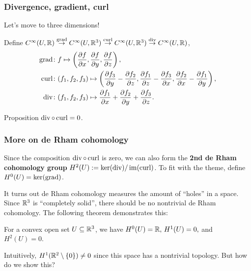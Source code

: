 \documentclass[xcolor=dvipsnames]{beamer}
\begin{document}
    \begin{frame}
        \frametitle{Divergence, gradient, curl} 
        Let's move to three dimensions!
        \begin{definition}
            Define $C^{\infty}(U,\mathbb{R}) \overset{\operatorname{grad}}{\to } C^{\infty}(U,\mathbb{R}^3)\overset{\operatorname{curl}}{\to } C^{\infty}(U,\mathbb{R}^3)\overset{\operatorname{div}}{\to } C^{\infty}(U,\mathbb{R})$, 
        \begin{align*}
   \operatorname{grad} \colon &f \mapsto \left( \frac{\partial f}{\partial x},\frac{\partial f}{\partial y},\frac{\partial f}{\partial z} \right), \\
   \operatorname{curl} \colon   &(f_1,f_2,f_3) \mapsto \left( \frac{\partial f_3}{\partial y}-\frac{\partial f_2}{\partial z},\frac{\partial f_1}{\partial z}-\frac{\partial f_3}{\partial x},\frac{\partial f_2}{\partial x}-\frac{\partial f_1}{\partial y}\right), \\
\operatorname{div} \colon &(f_1,f_2,f_3) \mapsto \frac{\partial f_1}{\partial x}+\frac{\partial f_2}{\partial y}+\frac{\partial f_3}{\partial z}.
\end{align*}
        \end{definition}%
\begin{block}{Proposition} 
$\operatorname{div} \circ \operatorname{curl} =0$.    
\end{block}
    \end{frame}
    \begin{frame}
    \frametitle{More on de Rham cohomology} 
    \begin{definition}
    Since the composition $\operatorname{div} \circ \operatorname{curl}$ is zero, we can also form the \textbf{2nd de Rham cohomology group} $H^2(U):=\ker (\operatorname{div}) / \operatorname{im}(\operatorname{curl})$. To fit with the theme, define $H^0(U)=\ker (\operatorname{grad})$. 
    \end{definition}%
    It turns out de Rham cohomology measures the amount of ``holes'' in a space. Since $\mathbb{R}^3$ is ``completely solid'', there should be no nontrivial de Rham cohomology. The following theorem demonstrates this:\pause
    \begin{theorem}
        For a convex open set $U \subseteq \mathbb{R}^3$, we have $H^0(U)=\mathbb{R},\,H^1(U)=0,$ and $H^2(U)=0$.
    \end{theorem}%
    Intuitively, $H^1(\mathbb{R}^2 \setminus \{0\} )\neq 0$ since this space has a nontrivial topology. But how do we show this?
    \end{frame}
\end{document}
